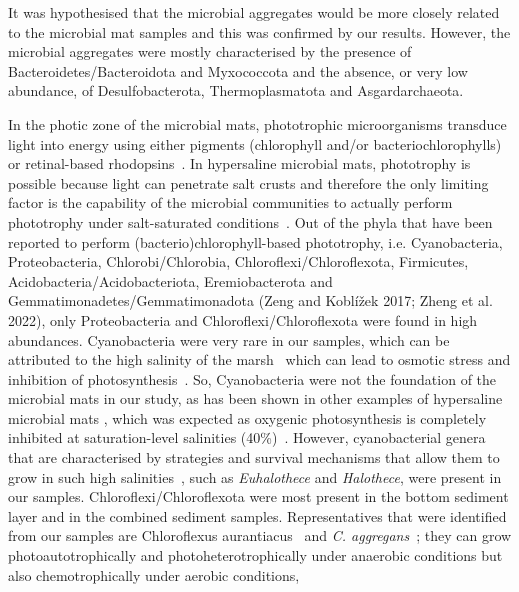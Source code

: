    It was hypothesised that the microbial aggregates would be more closely related to the microbial mat samples 
   and this was confirmed by our results. 
   However, the microbial aggregates were mostly characterised by the presence of Bacteroidetes/Bacteroidota and Myxococcota 
   and the absence, or very low abundance, of Desulfobacterota, Thermoplasmatota and Asgardarchaeota.

   In the photic zone of the microbial mats, phototrophic microorganisms transduce light into energy 
   using either pigments 
   (chlorophyll and/or bacteriochlorophylls) or retinal-based rhodopsins~\citep{kurth_carbon_2021}. 
   In hypersaline microbial mats, phototrophy is possible because light can penetrate salt crusts and therefore 
   the only limiting factor is the capability of the microbial communities to actually perform 
   phototrophy under salt-saturated conditions~\citep{meier_limitation_2021}. 
   Out of the phyla that have been reported to perform (bacterio)chlorophyll-based phototrophy, 
   i.e. Cyanobacteria, Proteobacteria, Chlorobi/Chlorobia, Chloroflexi/Chloroflexota, Firmicutes, Acidobacteria/Acidobacteriota, 
   Eremiobacterota and Gemmatimonadetes/Gemmatimonadota (Zeng and Koblížek 2017; Zheng et al. 2022), 
   only Proteobacteria and Chloroflexi/Chloroflexota were found in high abundances. 
   Cyanobacteria were very rare in our samples, which can be attributed to the high salinity of the marsh~\citep{diloreto_microbial_2019} 
   which can lead to osmotic stress and inhibition of photosynthesis~\citep{sudhir_effects_2004}. 
   So, Cyanobacteria were not the foundation of the microbial mats in our study, 
   as has been shown in other examples of hypersaline microbial mats 
   \citep{bolhuis_molecular_2014, wong_molecular_2016}, 
   which was expected as oxygenic photosynthesis is completely inhibited at saturation-level salinities (40\%)~\citep{meier_limitation_2021}. 
   However, cyanobacterial genera that  are characterised by strategies and survival mechanisms 
   that allow them to grow in such high salinities~\citep{oren_cyanobacteria_2015}, 
   such as \textit{Euhalothece} and \textit{Halothece}, were present in our samples. 
   Chloroflexi/Chloroflexota were most present in the bottom sediment layer and in the combined sediment samples. 
   Representatives that were identified from our samples are Chloroflexus aurantiacus~\citep{pierson_phototrophic_1974}
   and \textit{C. aggregans}~\citep{hanada_chloroflexus_1995}; 
   they can grow photoautotrophically and photoheterotrophically 
   under anaerobic conditions but also chemotrophically under aerobic conditions, 

